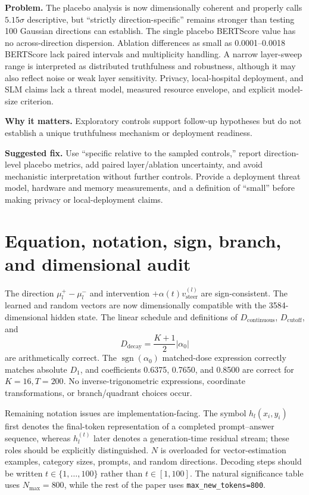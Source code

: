 \documentclass[11pt]{article}
\newcommand{\findinglabel}[1]{\textbf{#1}}
\begin{document}
\findinglabel{Problem.} The placebo analysis is now dimensionally coherent and properly calls $5.15\sigma$ descriptive, but ``strictly direction-specific'' remains stronger than testing 100 Gaussian directions can establish.  The single placebo BERTScore value has no across-direction dispersion.  Ablation differences as small as 0.0001--0.0018 BERTScore lack paired intervals and multiplicity handling.  A narrow layer-sweep range is interpreted as distributed truthfulness and robustness, although it may also reflect noise or weak layer sensitivity.  Privacy, local-hospital deployment, and SLM claims lack a threat model, measured resource envelope, and explicit model-size criterion.

\findinglabel{Why it matters.} Exploratory controls support follow-up hypotheses but do not establish a unique truthfulness mechanism or deployment readiness.

\findinglabel{Suggested fix.} Use ``specific relative to the sampled controls,'' report direction-level placebo metrics, add paired layer/ablation uncertainty, and avoid mechanistic interpretation without further controls.  Provide a deployment threat model, hardware and memory measurements, and a definition of ``small'' before making privacy or local-deployment claims.

\section*{Equation, notation, sign, branch, and dimensional audit}

The direction $\mu_l^+-\mu_l^-$ and intervention $+\alpha(t)v_{\text{steer}}^{(l)}$ are sign-consistent.  The learned and random vectors are now dimensionally compatible with the 3584-dimensional hidden state.  The linear schedule and definitions of $D_{\text{continuous}}$, $D_{\text{cutoff}}$, and
\[
D_{\text{decay}}=\frac{K+1}{2}|\alpha_0|
\]
are arithmetically correct.  The $\operatorname{sgn}(\alpha_0)$ matched-dose expression correctly matches absolute $D_1$, and coefficients 0.6375, 0.7650, and 0.8500 are correct for $K=16,T=200$.  No inverse-trigonometric expressions, coordinate transformations, or branch/quadrant choices occur.

Remaining notation issues are implementation-facing.  The symbol $h_l(x_i,y_i)$ first denotes the final-token representation of a completed prompt--answer sequence, whereas $h_l^{(t)}$ later denotes a generation-time residual stream; these roles should be explicitly distinguished.  $N$ is overloaded for vector-estimation examples, category sizes, prompts, and random directions.  Decoding steps should be written $t\in\{1,\ldots,100\}$ rather than $t\in[1,100]$.  The natural significance table uses $N_{\text{max}}=800$, while the rest of the paper uses \texttt{max\_new\_tokens=800}.
\end{document}
